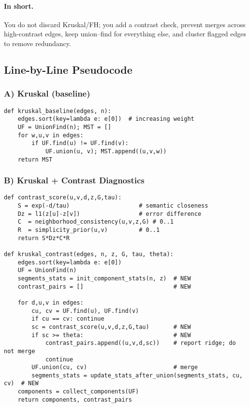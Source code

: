 \documentclass[11pt]{article}
\begin{document}
\paragraph{In short.} You do not discard Kruskal/FH; you add a contrast check, prevent merges across high-contrast edges, keep union--find for everything else, and cluster flagged edges to remove redundancy.

\subsection{Line-by-Line Pseudocode}\label{sec:pseudo}
\subsubsection*{A) Kruskal (baseline)}
\begin{lstlisting}[style=code]
def kruskal_baseline(edges, n):
    edges.sort(key=lambda e: e[0])  # increasing weight
    UF = UnionFind(n); MST = []
    for w,u,v in edges:
        if UF.find(u) != UF.find(v):
            UF.union(u, v); MST.append((u,v,w))
    return MST
\end{lstlisting}

\subsubsection*{B) Kruskal + Contrast Diagnostics}
\begin{lstlisting}[style=code]
def contrast_score(u,v,d,z,G,tau):
    S = exp(-d/tau)                    # semantic closeness
    Dz = l1(z[u]-z[v])                 # error difference
    C  = neighborhood_consistency(u,v,z,G) # 0..1
    R  = simplicity_prior(u,v)         # 0..1
    return S*Dz*C*R

def kruskal_contrast(edges, n, z, G, tau, theta):
    edges.sort(key=lambda e: e[0])
    UF = UnionFind(n)
    segments_stats = init_component_stats(n, z)  # NEW
    contrast_pairs = []                          # NEW

    for d,u,v in edges:
        cu, cv = UF.find(u), UF.find(v)
        if cu == cv: continue
        sc = contrast_score(u,v,d,z,G,tau)       # NEW
        if sc >= theta:                          # NEW
            contrast_pairs.append((u,v,d,sc))    # report ridge; do not merge
            continue
        UF.union(cu, cv)                         # merge
        segments_stats = update_stats_after_union(segments_stats, cu, cv)  # NEW
    components = collect_components(UF)
    return components, contrast_pairs
\end{lstlisting}
\end{document}
